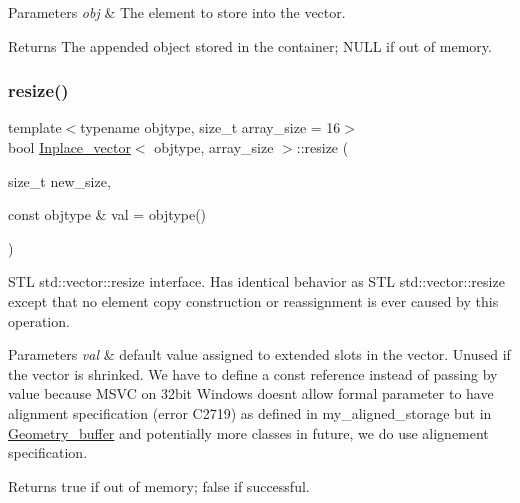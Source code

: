 \begin{DoxyParams}{Parameters}
{\em obj} & The element to store into the vector. \\
\hline
\end{DoxyParams}
\begin{DoxyReturn}{Returns}
The appended object stored in the container; N\+U\+LL if out of memory. 
\end{DoxyReturn}
\mbox{\label{classInplace__vector_a2785143f15f621c9d9ddf53e2b5e136c}} 
\subsubsection{\texorpdfstring{resize()}{resize()}}
{\footnotesize\ttfamily template$<$typename objtype, size\+\_\+t array\+\_\+size = 16$>$ \\
bool \mbox{\hyperlink{classInplace__vector}{Inplace\+\_\+vector}}$<$ objtype, array\+\_\+size $>$\+::resize (\begin{DoxyParamCaption}\item[{size\+\_\+t}]{new\+\_\+size,  }\item[{const objtype \&}]{val = {\ttfamily objtype()} }\end{DoxyParamCaption})\hspace{0.3cm}{\ttfamily [inline]}}

S\+TL std\+::vector\+::resize interface. Has identical behavior as S\+TL std\+::vector\+::resize except that no element copy construction or reassignment is ever caused by this operation.


\begin{DoxyParams}{Parameters}
{\em val} & default value assigned to extended slots in the vector. Unused if the vector is shrinked. We have to define a const reference instead of passing by value because M\+S\+VC on 32bit Windows doesn\textquotesingle{}t allow formal parameter to have alignment specification (error C2719) as defined in my\+\_\+aligned\+\_\+storage but in \mbox{\hyperlink{structGeometry__buffer}{Geometry\+\_\+buffer}} and potentially more classes in future, we do use alignement specification. \\
\hline
\end{DoxyParams}
\begin{DoxyReturn}{Returns}
true if out of memory; false if successful. 
\end{DoxyReturn}
\mbox{\label{classInplace__vector_aa24e13ea5106489e799fe97512227da0}} 
